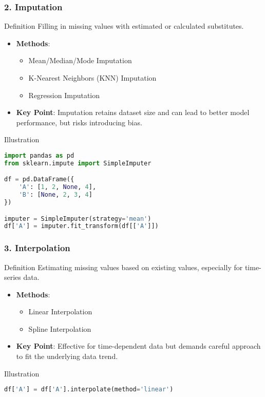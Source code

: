 \documentclass[aspectratio=169]{beamer}
\begin{document}
\begin{frame}[fragile]
    \frametitle{2. Imputation}
    \begin{block}{Definition}
        Filling in missing values with estimated or calculated substitutes.
    \end{block}
    \begin{itemize}
        \item \textbf{Methods}:
        \begin{itemize}
            \item Mean/Median/Mode Imputation
            \item K-Nearest Neighbors (KNN) Imputation
            \item Regression Imputation
        \end{itemize}
        \item \textbf{Key Point}: Imputation retains dataset size and can lead to better model performance, but risks introducing bias.
    \end{itemize}
    \begin{block}{Illustration}
    \begin{lstlisting}[language=Python]
import pandas as pd
from sklearn.impute import SimpleImputer

df = pd.DataFrame({
    'A': [1, 2, None, 4],
    'B': [None, 2, 3, 4]
})

imputer = SimpleImputer(strategy='mean')
df['A'] = imputer.fit_transform(df[['A']])
    \end{lstlisting}
    \end{block}
\end{frame}

\begin{frame}[fragile]
    \frametitle{3. Interpolation}
    \begin{block}{Definition}
        Estimating missing values based on existing values, especially for time-series data.
    \end{block}
    \begin{itemize}
        \item \textbf{Methods}:
        \begin{itemize}
            \item Linear Interpolation
            \item Spline Interpolation
        \end{itemize}
        \item \textbf{Key Point}: Effective for time-dependent data but demands careful approach to fit the underlying data trend.
    \end{itemize}
    \begin{block}{Illustration}
    \begin{lstlisting}[language=Python]
df['A'] = df['A'].interpolate(method='linear')
    \end{lstlisting}
    \end{block}
\end{frame}
\end{document}
